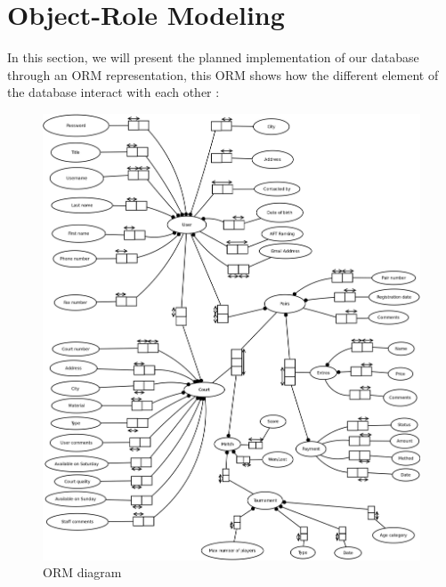 \section{Object-Role Modeling}

In this section, we will present the planned implementation of our database through an ORM representation, this ORM shows how the different element of the database interact with each other :


\begin{figure}[!ht]
    \centering
    \includegraphics[width=\linewidth]{ORM.png}
    \caption{ORM diagram}
\end{figure}
\FloatBarrier
